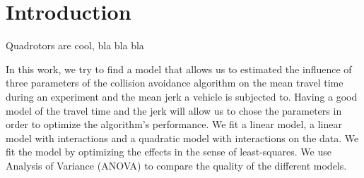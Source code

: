 \section{Introduction}

Quadrotors are cool, bla bla bla


In this work, we try to find a model that allows us to estimated the influence of three parameters of the collision avoidance algorithm on the mean travel time during an experiment and the mean jerk a vehicle is subjected to. Having a good model of the travel time and the jerk will allow us to chose the parameters in order to optimize the algorithm's performance. We fit a linear model, a linear model with interactions and a quadratic model with interactions on the data. We fit the model by optimizing the effects in the sense of least-squares.
We use Analysis of Variance (ANOVA) to compare the quality of the different models.